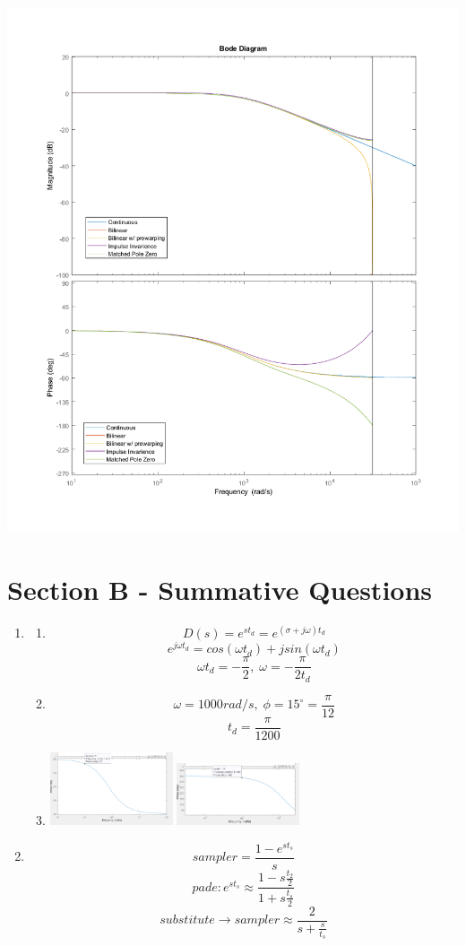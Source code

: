 \documentclass[11pt]{article}
\begin{document}
\begin{preview}
\begin{enumerate}
\begin{center}
        \includegraphics[height=0.3\textwidth]{fig/3_bode.png}
    \end{center}
\end{enumerate}

\section*{Section B - Summative Questions}
\begin{enumerate}
    \item 
    \begin{enumerate}
        \item $$D(s)=e^{st_{d}} = e^{(\sigma+j\omega)t_{d}}$$
        $$e^{j\omega t_d} = cos(\omega t_d) + jsin(\omega t_d)$$
        $$\omega t_d = -\frac{\pi}{2},\; \omega = -\frac{\pi}{2t_d}$$
        \item $$\omega = 1000 rad/s, \; \phi=15^{\circ} = \frac{\pi}{12}$$
        $$t_d = \frac{\pi}{1200}$$
        \item 
            \begin{center}
                \includegraphics[width=0.3\textwidth]{fig/b1c_270u.png}
                \includegraphics[width=0.3\textwidth]{fig/b1c_2_261u.png}
            \end{center}
    \end{enumerate}
    \item
    $$sampler = \frac{1-e^{st_s}}{s}$$
    $$pade: e^{st_s} \approx \frac{1-s\frac{t_2}{2}}{1+s\frac{t_s}{2}}$$
    $$substitute \rightarrow sampler \approx \frac{2}{s + \frac{s}{t_s}}$$
    \begin{center}

\end{center}
\end{enumerate}
\end{preview}
\end{document}

